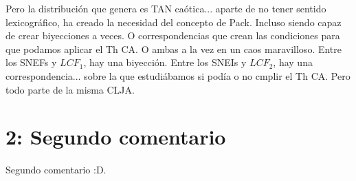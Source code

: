 Pero la distribución que genera es TAN caótica... aparte de no tener sentido lexicográfico, ha creado la necesidad del concepto de Pack. Incluso siendo capaz de crear biyecciones a veces. O correspondencias que crean las condiciones para que podamos aplicar el Th CA. O ambas a la vez en un caos maravilloso. Entre los SNEFs y $LCF_{1}$, hay una biyección. Entre los SNEIs y $LCF_{2}$, hay una correspondencia... sobre la que estudiábamos si podía o no cmplir el Th CA. Pero todo parte de la misma CLJA.   

\newpage

\section {2: Segundo comentario}

Segundo comentario :D.

\newpage